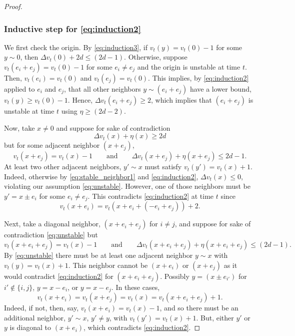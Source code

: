 \documentclass[12pt]{amsart}
\begin{document}
\begin{proof}
	\subsubsection*{Inductive step for \eqref{eq:induction2}}
	We first check the origin. By \eqref{eq:induction3}, if $v_t(y) = v_t(0)-1$
	for some $y \sim 0$, then $\Delta v_t(0) + 2 d \leq (2 d -1)$. Otherwise, 
	suppose $v_t(e_i + e_j) = v_t(0) - 1$ for some $e_i \not = e_j$ and the origin is unstable at time $t$. Then,
	$v_t(e_i) = v_t(0)$ and $v_t(e_j) = v_t(0)$. This implies, by \eqref{eq:induction2} applied to $e_i$ and $e_j$, that all other neighbors $y \sim (e_i + e_j)$ have a lower bound, $v_t(y) \geq v_t(0) - 1$. 
	Hence, $\Delta v_t(e_i + e_j) \geq 2$, which implies that $(e_i+e_j)$ is unstable at time $t$
	using $\eta \geq (2 d - 2)$. 
	
	Now, take $x \not = 0$ and suppose for sake of contradiction 
	\begin{equation} \label{eq:unstable}
	\Delta v_t(x) + \eta(x) \geq 2 d
	\end{equation}
	but for some adjacent neighbor $(x + e_j)$,  
	\begin{equation} \label{eq:stable_neighbor1}
	v_t(x+e_j) = v_t(x) - 1 \qquad \mbox{and} \qquad  \Delta v_t(x+e_j) + \eta(x+e_j) \leq 2 d -1.
	\end{equation}
	At least two other adjacent neighbors, $y' \sim x$ must satisfy $v_t(y') = v_t(x) + 1$.
	Indeed, otherwise by \eqref{eq:stable_neighbor1} and \eqref{eq:induction2},	 $\Delta v_t(x) \leq 0$, violating
	our assumption \eqref{eq:unstable}. However, one of those neighbors must be 
	$y' = x \pm e_i$ for some $e_i \not= e_j$. This contradicts
	\eqref{eq:induction2} at time $t$ since 
	\[
	v_t(x + e_i) = v_t(x + e_i + (-e_i + e_j)) + 2.
	\]
	
	Next, take a diagonal neighbor,  $(x + e_i + e_j)$ for $i \not = j$, and suppose for sake of contradiction \eqref{eq:unstable}
	but
	\begin{equation} \label{eq:stable_neighbor2}
	v_t(x+e_i+e_j) = v_t(x) - 1 \qquad \mbox{and} \qquad  \Delta v_t(x+e_i+e_j) + \eta(x+e_i+e_j) \leq (2 d -1).
	\end{equation}
	By \eqref{eq:unstable} there must be at least one adjacent neighbor $y \sim x$ with $v_t(y) = v_t(x) + 1$.
	This neighbor cannot be $(x+e_i)$ or $(x+e_j)$ as it would contradict \eqref{eq:induction2} for $(x+e_i+e_j)$.
	Possibly $y  = (x \pm e_{i'})$ for $i' \not \in \{ i,j\}$,  $y = x - e_i$, or $y = x - e_j$.
	In these cases, 
	\begin{equation} \label{eq:large_neighbors}
	v_t(x + e_i) = v_t(x+e_j) = v_t(x) = v_t(x+e_i+e_j) + 1.
	\end{equation}
	Indeed, if not, then, say, $v_t(x+e_i) = v_t(x) - 1$, and so there must be an additional neighbor, 
	$y' \sim x$, $y' \not = y$, with $v_t(y') = v_t(x) + 1$.  But, either $y'$ or $y$ is diagonal to $(x + e_i)$, 
	which contradicts \eqref{eq:induction2}. 
	

\end{proof}
\end{document}
